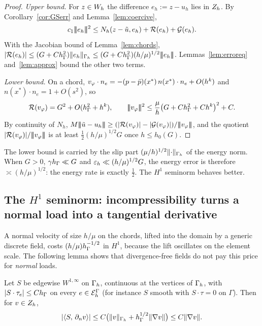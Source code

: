 \begin{proof}
\emph{Upper bound.} For $z\in W_h$ the difference $e_h:=z-u_h$ lies in $Z_h$. By Corollary~\ref{cor:GSerr} and Lemma~\ref{lem:coercive},
\[
c_1|\!|\!|e_h|\!|\!|^2\le N_h(z-\tilde u,e_h)+\mathcal R(e_h)+\mathcal G(e_h).
\]
With the Jacobian bound of Lemma~\ref{lem:chords}, $|\mathcal R(e_h)|\le(G+Ch_\Gamma^2)\lVert e_h\rVert_{\Gamma_h}\le(G+Ch_\Gamma^2)(h/\mu)^{1/2}|\!|\!|e_h|\!|\!|$. Lemmas~\ref{lem:erroreq} and~\ref{lem:approx} bound the other two terms.

\emph{Lower bound.} On a chord, $v_\varphi\cdot n_e=-(p-\bar p)(x^\ast)\,n(x^\ast)\cdot n_e+O(h^k)$ and $n(x^\ast)\cdot n_e=1+O(s^2)$, so
\[
\mathcal R(v_\varphi)=G^2+O(h_\Gamma^2+h^k),\qquad |\!|\!|v_\varphi|\!|\!|^2\le\frac\mu h\bigl(G+Ch_\Gamma^2+Ch^k\bigr)^2+C .
\]
By continuity of $N_h$, $M\tnorm{\ut-u_h}\ge(|\Rc(v_\varphi)|-|\Gc(v_\varphi)|)/\tnorm{v_\varphi}$, and the quotient $|\mathcal R(v_\varphi)|/|\!|\!|v_\varphi|\!|\!|$ is at least $\frac12(h/\mu)^{1/2}G$ once $h\le h_0(G)$.
\end{proof}

The lower bound is carried by the slip part $(\mu/h)^{1/2}\lVert \cdot\rVert_{\Gamma_h}$ of the energy norm. When $G>0$, $\gamma h_\Gamma\ll G$ and $\varepsilon_h\ll(h/\mu)^{1/2}G$, the energy error is therefore $\asymp(h/\mu)^{1/2}$: the energy rate is exactly $\frac12$. The $H^1$ seminorm behaves better.

\subsection{The \texorpdfstring{$H^1$}{H1} seminorm: incompressibility turns a normal load into a tangential derivative}
A normal velocity of size $h/\mu$ on the chords, lifted into the domain by a generic discrete field, costs $(h/\mu)h_\Gamma^{-1/2}$ in $H^1$, because the lift oscillates on the element scale. The following lemma shows that divergence-free fields do not pay this price for \emph{normal} loads.

\begin{lemma}\label{lem:cancel}
Let $S$ be edgewise $W^{1,\infty}$ on $\Gamma_h$, continuous at the vertices of $\Gamma_h$, with $|S\cdot\tau_e|\le Ch_\Gamma$ on every $e\in\mathcal E_h^\Gamma$ (for instance $S$ smooth with $S\cdot\tau=0$ on $\Gamma$). Then for $v\in Z_h$,
\[
|\langle S,\, \partial_n v\rangle|\le C\bigl(\lVert v\rVert_{\Gamma_h}+h_\Gamma^{1/2}\lVert \nabla v\rVert\bigr)\le C\lVert \nabla v\rVert.
\]
\end{lemma}

